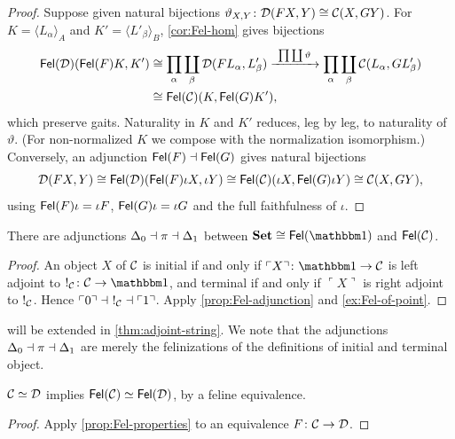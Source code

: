 \begin{proof}
Suppose given natural bijections $\vartheta_{X,Y}\colon\mathcal{D}(FX,Y)\cong\mathcal{C}(X,GY)$.
For $K=\langle L_\alpha\rangle_A$ and $K'=\langle L'_\beta\rangle_B$,
\cref{cor:Fel-hom} gives bijections
\begin{align*}
\Fel(\cD)(\Fel(F)K,K')&\iso\prod_{\alpha}\coprod_{\beta}\cD(FL_\alpha,L'_\beta)
\xrightarrow{\ \prod\coprod\vartheta\ }\prod_{\alpha}\coprod_{\beta}\cC(L_\alpha,GL'_\beta)\\
&\iso\Fel(\cC)(K,\Fel(G)K'),
\end{align*}
which preserve gaits. Naturality in $K$ and $K'$ reduces, leg by leg, to
naturality of $\vartheta$. (For non-normalized $K$ we compose with the
normalization isomorphism.) Conversely, an adjunction $\mathsf{Fel}(F)\dashv\mathsf{Fel}(G)$
gives natural bijections
\[
\mathcal{D}(FX,Y)\cong\mathsf{Fel}(\mathcal{D})(\mathsf{Fel}(F)\iota X,\iota Y)\cong\mathsf{Fel}(\mathcal{C})(\iota X,\mathsf{Fel}(G)\iota Y)\cong\mathcal{C}(X,GY),
\]
using $\mathsf{Fel}(F)\iota=\iota F$, $\mathsf{Fel}(G)\iota=\iota G$ and the full faithfulness
of $\iota$.
\end{proof}

\begin{corollary}\label{cor:first-string}
There are adjunctions $\Delta_0\dashv\pi\dashv\Delta_1$ between
$\Set\iso\Fel(\one)$ and $\mathsf{Fel}(\mathcal{C})$.
\end{corollary}

\begin{proof}
An object $X$ of $\mathcal{C}$ is initial if and only if $\ulcorner X\urcorner\colon\one\to\cC$
is left adjoint to $!_\cC\colon\cC\to\one$, and terminal if and only if
$\ulcorner X\urcorner$ is right adjoint to $!_{\mathcal{C}}$. Hence
$\ulcorner0\urcorner\dashv\ !_\cC\dashv\ulcorner1\urcorner$. Apply
\cref{prop:Fel-adjunction} and \cref{ex:Fel-of-point}.
\end{proof}

 will be extended in \cref{thm:adjoint-string}. We note
that the adjunctions $\Delta_0\dashv\pi\dashv\Delta_1$ are merely the
felinizations of the definitions of initial and terminal object.

\begin{corollary}\label{cor:Fel-equivalence}
$\mathcal{C}\simeq\mathcal{D}$ implies $\mathsf{Fel}(\mathcal{C})\simeq\mathsf{Fel}(\mathcal{D})$, by a feline equivalence.
\end{corollary}

\begin{proof}
Apply \cref{prop:Fel-properties} to an equivalence $F\colon\mathcal{C}\to\mathcal{D}$.
\end{proof}

